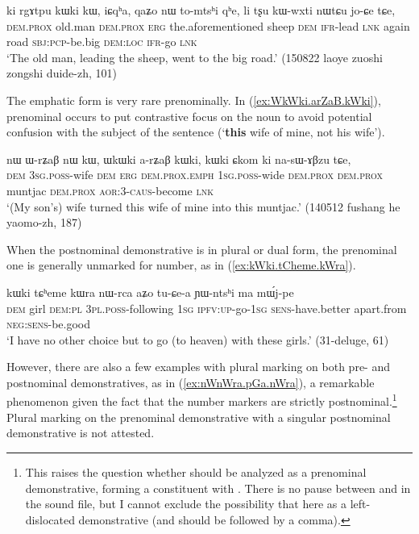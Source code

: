 \begin{exe}
\ex \label{ex:ki.rgAtpu.kWki}
 \gll ki rgɤtpu kɯki kɯ, iɕqʰa, qaʑo nɯ to-mtsʰi qʰe, li tʂu kɯ-wxti nɯtɕu jo-ɕe tɕe, \\
\textsc{dem}.\textsc{prox} old.man \textsc{dem}.\textsc{prox} \textsc{erg} the.aforementioned sheep \textsc{dem} \textsc{ifr}-lead \textsc{lnk} again road \textsc{sbj}:\textsc{pcp}-be.big \textsc{dem}:\textsc{loc} \textsc{ifr}-go \textsc{lnk} \\
\glt `The old man, leading the sheep, went to the big road.' (150822 laoye zuoshi zongshi duide-zh, 101)
\end{exe}

The emphatic form is very rare prenominally. In (\ref{ex:WkWki.arZaB.kWki}), prenominal  occurs to put contrastive focus on the noun to avoid potential confusion with the subject of the sentence (`\textbf{this} wife of mine, not his wife').

\begin{exe}
\ex \label{ex:WkWki.arZaB.kWki}
 \gll   nɯ ɯ-rʑaβ nɯ kɯ, ɯkɯki a-rʑaβ kɯki, kɯki ɕkom ki na-sɯ-ɤβzu tɕe, \\
 \textsc{dem} \textsc{3sg}.\textsc{poss}-wife \textsc{dem} \textsc{erg} \textsc{dem}.\textsc{prox}.\textsc{emph} \textsc{1sg}.\textsc{poss}-wide \textsc{dem}.\textsc{prox} \textsc{dem}.\textsc{prox} muntjac \textsc{dem}.\textsc{prox}  \textsc{aor}:3\flobv{}-\textsc{caus}-become \textsc{lnk} \\
\glt `(My son's) wife turned this wife of mine into this muntjac.' (140512 fushang he yaomo-zh, 187)
\end{exe}

When the postnominal demonstrative is in plural or dual form, the prenominal one is generally unmarked for number, as in (\ref{ex:kWki.tCheme.kWra}).

\begin{exe}
\ex \label{ex:kWki.tCheme.kWra}
 \gll kɯki tɕʰeme kɯra nɯ-rca aʑo tu-ɕe-a ɲɯ-ntsʰi ma mɯ́j-pe \\
 \textsc{dem} girl \textsc{dem}:\textsc{pl} \textsc{3pl}.\textsc{poss}-following \textsc{1sg} \textsc{ipfv}:\textsc{up}-go-\textsc{1sg} \textsc{sens}-have.better apart.from \textsc{neg}:\textsc{sens}-be.good \\
 \glt `I have no other choice but to go (to heaven) with these girls.' (31-deluge, 61)
 \end{exe}

However, there are also a few examples with plural marking on both pre- and postnominal demonstratives, as in (\ref{ex:nWnWra.pGa.nWra}), a remarkable phenomenon given the fact that the number markers are strictly postnominal.\footnote{This raises the question whether  should be analyzed as a prenominal demonstrative, forming a constituent with . There is no pause between  and  in the sound file, but I cannot exclude the possibility that  here as a left-dislocated demonstrative (and should be followed by a comma).  } Plural marking on the prenominal demonstrative with a singular postnominal demonstrative is not attested.
 
